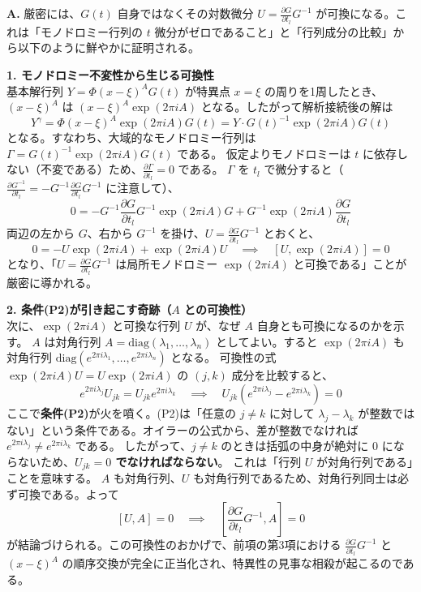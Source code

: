 \begin{Q}
\begin{itemize}
    \begin{Q}
\textbf{A.} 厳密には、$G(t)$ 自身ではなくその対数微分 $U = \frac{\partial G}{\partial t_l}G^{-1}$ が可換になる。これは「モノドロミー行列の $t$ 微分がゼロであること」と「行列成分の比較」から以下のように鮮やかに証明される。

\textbf{1. モノドロミー不変性から生じる可換性} \\
基本解行列 $Y = \Phi (x-\xi)^A G(t)$ が特異点 $x=\xi$ の周りを1周したとき、$(x-\xi)^A$ は $(x-\xi)^A \exp(2\pi i A)$ となる。したがって解析接続後の解は
\[
  Y^\gamma = \Phi (x-\xi)^A \exp(2\pi i A) G(t) = Y \cdot G(t)^{-1} \exp(2\pi i A) G(t)
\]
となる。すなわち、大域的なモノドロミー行列は $\Gamma = G(t)^{-1} \exp(2\pi i A) G(t)$ である。
仮定よりモノドロミーは $t$ に依存しない（不変である）ため、$\frac{\partial \Gamma}{\partial t_l} = 0$ である。
$\Gamma$ を $t_l$ で微分すると（$\frac{\partial G^{-1}}{\partial t_l} = -G^{-1}\frac{\partial G}{\partial t_l}G^{-1}$ に注意して）、
\[
  0 = -G^{-1}\frac{\partial G}{\partial t_l}G^{-1} \exp(2\pi i A) G + G^{-1} \exp(2\pi i A) \frac{\partial G}{\partial t_l}
\]
両辺の左から $G$、右から $G^{-1}$ を掛け、$U = \frac{\partial G}{\partial t_l}G^{-1}$ とおくと、
\[
  0 = -U \exp(2\pi i A) + \exp(2\pi i A) U \quad \implies \quad [U, \exp(2\pi i A)] = 0
\]
となり、「$U = \frac{\partial G}{\partial t_l}G^{-1}$ は局所モノドロミー $\exp(2\pi i A)$ と可換である」ことが厳密に導かれる。

\textbf{2. 条件(P2)が引き起こす奇跡（$A$ との可換性）} \\
次に、$\exp(2\pi i A)$ と可換な行列 $U$ が、なぜ $A$ 自身とも可換になるのかを示す。
$A$ は対角行列 $A = \mathrm{diag}(\lambda_1, \dots, \lambda_n)$ としてよい。すると $\exp(2\pi i A)$ も対角行列 $\mathrm{diag}(e^{2\pi i \lambda_1}, \dots, e^{2\pi i \lambda_n})$ となる。
可換性の式 $\exp(2\pi i A) U = U \exp(2\pi i A)$ の $(j, k)$ 成分を比較すると、
\[
  e^{2\pi i \lambda_j} U_{jk} = U_{jk} e^{2\pi i \lambda_k} \quad \implies \quad U_{jk} \left( e^{2\pi i \lambda_j} - e^{2\pi i \lambda_k} \right) = 0
\]
ここで\textbf{条件(P2)}が火を噴く。(P2)は「任意の $j \neq k$ に対して $\lambda_j - \lambda_k$ が整数ではない」という条件である。オイラーの公式から、差が整数でなければ $e^{2\pi i \lambda_j} \neq e^{2\pi i \lambda_k}$ である。
したがって、$j \neq k$ のときは括弧の中身が絶対に $0$ にならないため、\textbf{$U_{jk} = 0$ でなければならない}。
これは「行列 $U$ が対角行列である」ことを意味する。
$A$ も対角行列、$U$ も対角行列であるため、対角行列同士は必ず可換である。よって
\[
  [U, A] = 0 \quad \implies \quad \left[ \frac{\partial G}{\partial t_l}G^{-1}, A \right] = 0
\]
が結論づけられる。この可換性のおかげで、前項の第3項における $\frac{\partial G}{\partial t_l}G^{-1}$ と $(x-\xi)^A$ の順序交換が完全に正当化され、特異性の見事な相殺が起こるのである。
\end{Q}


\end{itemize}
\end{Q}
